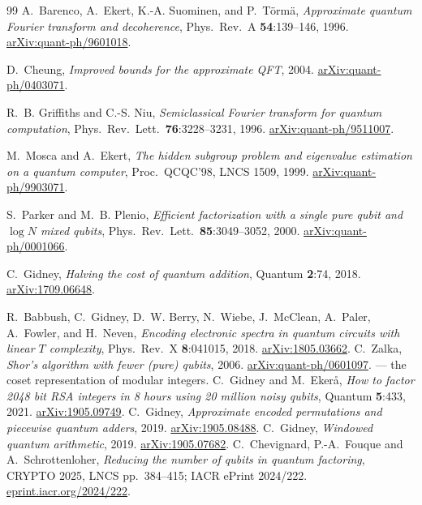 \documentclass[11pt]{article}
\theoremstyle{plain}
\theoremstyle{remark}
\begin{document}
\begin{thebibliography}{99}
A.~Barenco, A.~Ekert, K.-A. Suominen, and P.~T\"orm\"a,
\emph{Approximate quantum Fourier transform and decoherence},
Phys.\ Rev.\ A \textbf{54}:139--146, 1996.
\href{https://arxiv.org/abs/quant-ph/9601018}{arXiv:quant-ph/9601018}.

D.~Cheung,
\emph{Improved bounds for the approximate QFT},
2004. \href{https://arxiv.org/abs/quant-ph/0403071}{arXiv:quant-ph/0403071}.

R.~B. Griffiths and C.-S. Niu,
\emph{Semiclassical Fourier transform for quantum computation},
Phys.\ Rev.\ Lett.\ \textbf{76}:3228--3231, 1996.
\href{https://arxiv.org/abs/quant-ph/9511007}{arXiv:quant-ph/9511007}.

M.~Mosca and A.~Ekert,
\emph{The hidden subgroup problem and eigenvalue estimation on a quantum computer},
Proc.\ QCQC'98, LNCS 1509, 1999.
\href{https://arxiv.org/abs/quant-ph/9903071}{arXiv:quant-ph/9903071}.

S.~Parker and M.~B. Plenio,
\emph{Efficient factorization with a single pure qubit and $\log N$ mixed qubits},
Phys.\ Rev.\ Lett.\ \textbf{85}:3049--3052, 2000.
\href{https://arxiv.org/abs/quant-ph/0001066}{arXiv:quant-ph/0001066}.

C.~Gidney,
\emph{Halving the cost of quantum addition},
Quantum \textbf{2}:74, 2018.
\href{https://arxiv.org/abs/1709.06648}{arXiv:1709.06648}.

 R.~Babbush, C.~Gidney, D.~W. Berry, N.~Wiebe, J.~McClean, A.~Paler,
A.~Fowler, and H.~Neven, \emph{Encoding electronic spectra in quantum circuits with linear
$T$ complexity}, Phys.\ Rev.\ X \textbf{8}:041015, 2018.
\href{https://arxiv.org/abs/1805.03662}{arXiv:1805.03662}.
 C.~Zalka, \emph{Shor's algorithm with fewer (pure) qubits}, 2006.
\href{https://arxiv.org/abs/quant-ph/0601097}{arXiv:quant-ph/0601097}. --- the coset
representation of modular integers.
 C.~Gidney and M.~Eker\aa, \emph{How to factor 2048 bit RSA integers
in 8 hours using 20 million noisy qubits}, Quantum \textbf{5}:433, 2021.
\href{https://arxiv.org/abs/1905.09749}{arXiv:1905.09749}.
C.~Gidney, \emph{Approximate encoded permutations and piecewise quantum adders}, 2019.
\href{https://arxiv.org/abs/1905.08488}{arXiv:1905.08488}.
C.~Gidney,
\emph{Windowed quantum arithmetic},
2019. \href{https://arxiv.org/abs/1905.07682}{arXiv:1905.07682}.
C.~Chevignard, P.-A.~Fouque and A.~Schrottenloher,
\emph{Reducing the number of qubits in quantum factoring},
CRYPTO 2025, LNCS pp.~384--415; IACR ePrint 2024/222.
\href{https://eprint.iacr.org/2024/222}{eprint.iacr.org/2024/222}.


\end{thebibliography}
\end{document}
